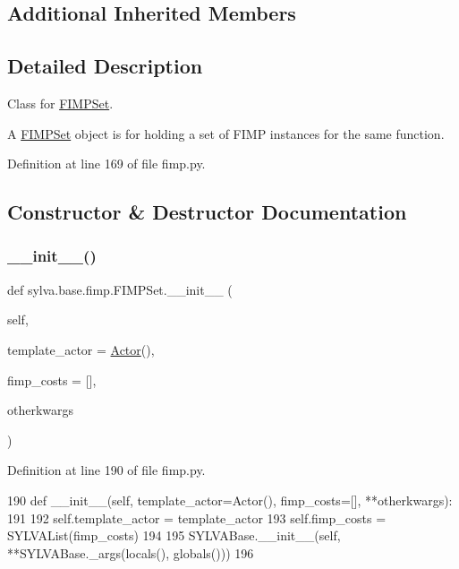 \subsection*{Additional Inherited Members}


\subsection{Detailed Description}
Class for \hyperlink{classsylva_1_1base_1_1fimp_1_1_f_i_m_p_set}{F\+I\+M\+P\+Set}. 

A \hyperlink{classsylva_1_1base_1_1fimp_1_1_f_i_m_p_set}{F\+I\+M\+P\+Set} object is for holding a set of F\+I\+MP instances for the same function. 

Definition at line 169 of file fimp.\+py.



\subsection{Constructor \& Destructor Documentation}
\mbox{\label{classsylva_1_1base_1_1fimp_1_1_f_i_m_p_set_a96a122cc6ae09985c360143cdb7eca58}} 
\subsubsection{\texorpdfstring{\+\_\+\+\_\+init\+\_\+\+\_\+()}{\_\_init\_\_()}}
{\footnotesize\ttfamily def sylva.\+base.\+fimp.\+F\+I\+M\+P\+Set.\+\_\+\+\_\+init\+\_\+\+\_\+ (\begin{DoxyParamCaption}\item[{}]{self,  }\item[{}]{template\+\_\+actor = {\ttfamily \hyperlink{classsylva_1_1base_1_1sdf_1_1_actor}{Actor}()},  }\item[{}]{fimp\+\_\+costs = {\ttfamily \mbox{[}\mbox{]}},  }\item[{}]{otherkwargs }\end{DoxyParamCaption})}



Definition at line 190 of file fimp.\+py.


\begin{DoxyCode}
190     \textcolor{keyword}{def }\_\_init\_\_(self, template\_actor=Actor(), fimp\_costs=[], **otherkwargs):
191 
192         self.template\_actor = template\_actor
193         self.fimp\_costs = SYLVAList(fimp\_costs)
194 
195         SYLVABase.\_\_init\_\_(self, **SYLVABase.\_args(locals(), globals()))
196 
\end{DoxyCode}


